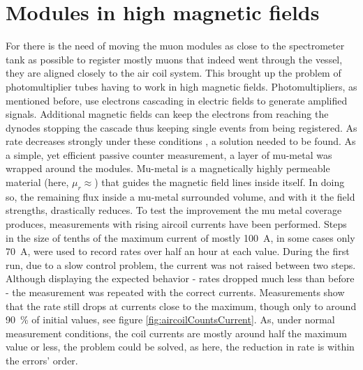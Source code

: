   \section{Modules in high magnetic fields}
  \label{ch:Analysis:sec:Modules in high magnetic fields}
  For there is the need of moving the muon modules as close to the spectrometer tank as possible to register mostly muons that indeed went through the vessel, they are aligned closely to the air coil system. This brought up the problem of photomultiplier tubes having to work in high magnetic fields. Photomultipliers, as mentioned before, use electrons cascading in electric fields to generate amplified signals. Additional magnetic fields can keep the electrons from reaching the dynodes stopping the cascade thus keeping single events from being registered. As rate decreases strongly under these conditions , a solution needed to be found. As a simple, yet efficient passive counter measurement, a layer of mu-metal was wrapped around the modules. Mu-metal is a magnetically highly permeable material (here, $\mu_r\approx $) that guides the magnetic field lines inside itself. In doing so, the remaining flux inside a mu-metal surrounded volume, 
and with it the field strengths, drastically reduces.
  To test the improvement the mu metal coverage produces, measurements with rising aircoil currents have been performed.
  Steps in the size of tenths of the maximum current of mostly \SI{100}{\ampere}, in some cases only \SI{70}{\ampere}, were used to record rates over half an hour at each value.
  During the first run, due to a slow control problem, the current was not raised between two steps. Although displaying the expected behavior - rates dropped much less than before - the measurement was repeated with the correct currents.
  Measurements show that the rate still drops at currents close to the maximum, though only to around \SI{90}{\percent} of initial values, see figure \ref{fig:aircoilCountsCurrent}. As, under normal measurement conditions, the coil currents are mostly around half the maximum value or less, the problem could be solved, as here, the reduction in rate is within the errors' order.
